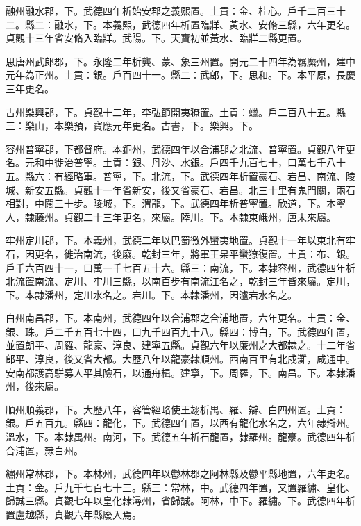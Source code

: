 \begin{pinyinscope}
 融州融水郡，下。武德四年析始安郡之義熙置。土貢：金、桂心。戶千二百三十二。縣二：融水，下。本義熙，武德四年析置臨牂、黃水、安脩三縣，六年更名。貞觀十三年省安脩入臨牂。武陽。下。天寶初並黃水、臨牂二縣更置。



 思唐州武郎郡，下。永隆二年析龔、蒙、象三州置。開元二十四年為羈縻州，建中元年為正州。土貢：銀。戶百四十一。縣二：武郎，下。思和。下。本平原，長慶三年更名。



 古州樂興郡，下。貞觀十二年，李弘節開夷獠置。土貢：蠟。戶二百八十五。縣三：樂山，本樂預，寶應元年更名。古書，下。樂興。下。



 容州普寧郡，下都督府。本銅州，武德四年以合浦郡之北流、普寧置。貞觀八年更名。元和中徙治普寧。土貢：銀、丹沙、水銀。戶四千九百七十，口萬七千八十五。縣六：有經略軍。普寧，下。北流，下。武德四年析置豪石、宕昌、南流、陵城、新安五縣。貞觀十一年省新安，後又省豪石、宕昌。北三十里有鬼門關，兩石相對，中闊三十步。陵城，下。渭龍，下。武德四年析普寧置。欣道，下。本寧人，隸藤州。貞觀二十三年更名，來屬。陸川。下。本隸東峨州，唐末來屬。



 牢州定川郡，下。本義州，武德二年以巴蜀徼外蠻夷地置。貞觀十一年以東北有牢石，因更名，徙治南流，後廢。乾封三年，將軍王杲平蠻獠復置。土貢：布、銀。戶千六百四十一，口萬一千七百五十六。縣三：南流，下。本隸容州，武德四年析北流置南流、定川、牢川三縣，以南百步有南流江名之，乾封三年皆來屬。定川，下。本隸潘州，定川水名之。宕川。下。本隸潘州，因瀘宕水名之。



 白州南昌郡，下。本南州，武德四年以合浦郡之合浦地置，六年更名。土貢：金、銀、珠。戶二千五百七十四，口九千四百九十八。縣四：博白，下。武德四年置，並置朗平、周羅、龍豪、淳良、建寧五縣。貞觀六年以廉州之大都隸之。十二年省郎平、淳良，後又省大都。大歷八年以龍豪隸順州。西南百里有北戍灘，咸通中。安南都護高駢募人平其險石，以通舟楫。建寧，下。周羅，下。南昌。下。本隸潘州，後來屬。



 順州順義郡，下。大歷八年，容管經略使王翃析禺、羅、辯、白四州置。土貢：銀。戶五百九。縣四：龍化，下。武德四年置，以西有龍化水名之，六年隸辯州。溫水，下。本隸禺州。南河，下。武德五年析石龍置，隸羅州。龍豪。武德四年析合浦置，隸白州。



 繡州常林郡，下。本林州，武德四年以鬱林郡之阿林縣及鬱平縣地置，六年更名。土貢：金。戶九千七百七十三。縣三：常林，中。武德四年置，又置羅繡、皇化、歸誠三縣。貞觀七年以皇化隸潯州，省歸誠。阿林，中下。羅繡。下。武德四年析置盧越縣，貞觀六年縣廢入焉。




\end{pinyinscope}
